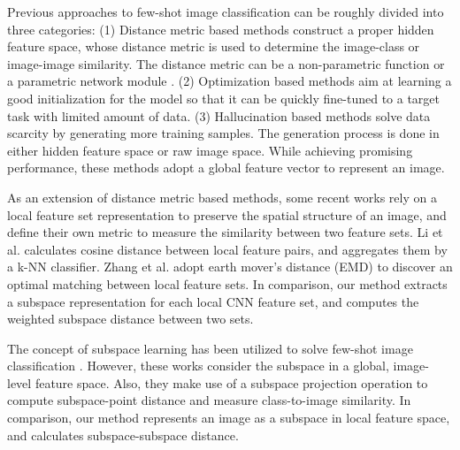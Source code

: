 Previous approaches to few-shot image classification can be roughly divided into three categories:
(1) Distance metric based methods \cite{snell2017prototypical,vinyals2016matching,relationnet} construct a proper hidden feature space, whose distance metric is used to determine the image-class or image-image similarity.
The distance metric can be a non-parametric function \cite{snell2017prototypical,vinyals2016matching} or a parametric network module \cite{relationnet}.
(2) Optimization based methods \cite{finn2017model,jamal2019task,munkhdalai2018rapid} aim at learning a good initialization for the model so that it can be quickly fine-tuned to a target task with limited amount of data.
(3) Hallucination based methods \cite{hariharan2017low,wang2018low,lin2019semantics,kimmodel} solve data scarcity by generating more training samples.
The generation process is done in either hidden feature space or raw image space.
While achieving promising performance, these methods adopt a global feature vector to represent an image.

As an extension of distance metric based methods, some recent works \cite{zhang2020deepemd,li2019revisiting} rely on a local feature set representation to preserve the spatial structure of an image, and define their own metric to measure the similarity between two feature sets.
Li et al. \cite{li2019revisiting} calculates cosine distance between local feature pairs, and aggregates them by a k-NN classifier.
Zhang et al. \cite{zhang2020deepemd} adopt earth mover's distance (EMD) to discover an optimal matching between local feature sets.
In comparison, our method extracts a subspace representation for each local CNN feature set, and computes the weighted subspace distance between two sets.

The concept of subspace learning has been utilized to solve few-shot image classification \cite{pmlr-v97-yoon19a,simon2020adaptive}.
However, these works consider the subspace in a global, image-level feature space.
Also, they make use of a subspace projection operation to compute subspace-point distance and measure class-to-image similarity.
In comparison, our method represents an image as a subspace in local feature space, and calculates subspace-subspace distance.
